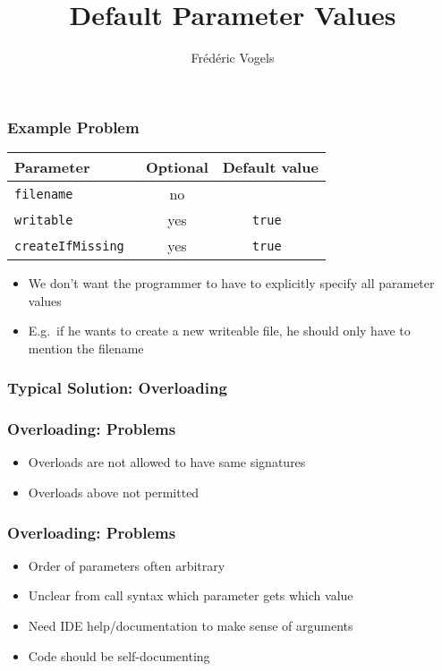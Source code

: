 \usepackage{ucll-code}

\usetikzlibrary{shadows,shapes.multipart}

\title{Default Parameter Values}
\author{Fr\'ed\'eric Vogels}


\lstset{language=c++14}




\begin{frame}
  \titlepage
\end{frame}

\begin{frame}
  \frametitle{Example Problem}
  \begin{center}
    \begin{tabular}{lcc}
      \textbf{Parameter} & \textbf{Optional} & \textbf{Default value} \\
      \toprule
      \tt filename & no & \\
      \tt writable & yes & \tt true \\
      \tt createIfMissing & yes & \tt true \\
    \end{tabular}
  \end{center}
  \begin{itemize}
    \item We don't want the programmer to have to explicitly specify all parameter values
    \item E.g.\ if he wants to create a new writeable file, he should only have to mention the filename
  \end{itemize}
\end{frame}

\begin{frame}
  \frametitle{Typical Solution: Overloading}
\end{frame}

\begin{frame}
  \frametitle{Overloading: Problems}
  \begin{itemize}
    \item Overloads are not allowed to have same signatures
    \item Overloads above not permitted
  \end{itemize}
\end{frame}

\begin{frame}
  \frametitle{Overloading: Problems}
  \begin{itemize}
    \item Order of parameters often arbitrary
    \item Unclear from call syntax which parameter gets which value
    \item Need IDE help/documentation to make sense of arguments
    \item Code should be self-documenting
  \end{itemize}
\end{frame}

